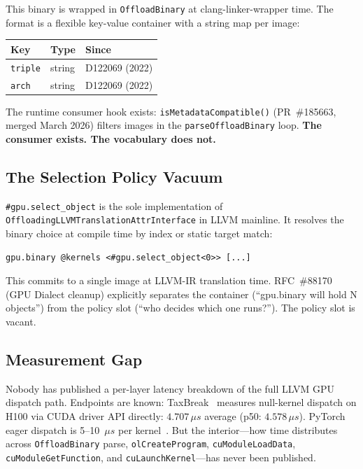 \documentclass[11pt]{article}
\begin{document}
This binary is wrapped in \texttt{OffloadBinary} at clang-linker-wrapper time.
The format is a flexible key-value container with a string map per image:

\begin{center}
\begin{tabular}{lll}
  \toprule
  Key & Type & Since \\
  \midrule
  \texttt{triple} & string & D122069 (2022) \\
  \texttt{arch} & string & D122069 (2022) \\
  \bottomrule
\end{tabular}
\end{center}

The runtime consumer hook exists: \texttt{isMetadataCompatible()} (PR~\#185663, merged March 2026) filters images in the \texttt{parseOffloadBinary} loop.
\textbf{The consumer exists. The vocabulary does not.}

\subsection{The Selection Policy Vacuum}

\texttt{\#gpu.select\_object} is the sole implementation of \texttt{OffloadingLLVMTranslationAttrInterface} in LLVM mainline.
It resolves the binary choice at compile time by index or static target match:

\begin{lstlisting}[language=MLIR]
gpu.binary @kernels <#gpu.select_object<0>> [...]
\end{lstlisting}

This commits to a single image at LLVM-IR translation time.
RFC~\#88170 (GPU Dialect cleanup) explicitly separates the container (``gpu.binary will hold N objects'') from the policy slot (``who decides which one runs?'').
The policy slot is vacant.

\subsection{Measurement Gap}

Nobody has published a per-layer latency breakdown of the full LLVM GPU dispatch path.
Endpoints are known:
TaxBreak~\cite{taxbreak} measures null-kernel dispatch on H100 via CUDA driver API directly: \(4.707\,\mu s\) average (p50: \(4.578\,\mu s\)).
PyTorch eager dispatch is 5--10~\(\mu s\) per kernel~\cite{pygraph}.
But the interior---how time distributes across \texttt{OffloadBinary} parse, \texttt{olCreateProgram}, \texttt{cuModuleLoadData}, \texttt{cuModuleGetFunction}, and \texttt{cuLaunchKernel}---has never been published.
\end{document}
